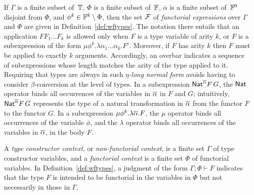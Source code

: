 \documentclass{lmcs}
\theoremstyle{plain}\newtheorem{satz}[thm]{Satz}
\begin{document}
If $\Gamma$ is a finite subset of\, $\mathbb{T}$, $\Phi$ is a finite
subset of\, $\mathbb{F}$, $\overline{\alpha}$ is a finite subset of\,
$\mathbb{F}^0$ disjoint from $\Phi$, and $\phi^k \in \mathbb{F}^k \setminus
\Phi$, then the set $\mathcal{F}$ of {\color{red} {\em functorial expressions}} over
$\Gamma$ and $\Phi$ are given in Definition~\ref{def:wftypes}. The
notation there entails that an application $F F_1...F_k$ is allowed
only when $F$ is a type variable of arity $k$, or $F$ is a
subexpression of the form $\mu \phi^{k}.\lambda
\alpha_1...\alpha_k.F'$. Moreover, if $F$ has arity $k$ then $F$ must
be applied to exactly $k$ arguments.  Accordingly, an overbar
indicates a sequence of subexpressions whose length matches the arity
of the type applied to it.  Requiring that types are always in such
\emph{$\eta$-long normal form} avoids having to consider
$\beta$-conversion at the level of types. In a subexpression
$\mathsf{Nat}^{\overline{\alpha}}F\,G$, the $\mathsf{Nat}$ operator binds all occurrences of
the variables in $\overline{\alpha}$ in $F$ and $G$; intuitively,
$\mathsf{Nat}^{\overline{\alpha}}F\,G$ represents the type of a natural
transformation in $\overline{\alpha}$ from the functor $F$ to the functor
$G$.  In a subexpression $\mu \phi^k.\lambda \overline{\alpha}.F$, the $\mu$
operator binds all occurrences of the variable $\phi$, and the
$\lambda$ operator binds all occurrences of the variables in
$\overline{\alpha}$, in the body $F$.

A {\em type constructor context}, or {\em non-functorial context}, is
a finite set $\Gamma$ of type constructor variables, and a {\em
  functorial context} is a finite set $\Phi$ of functorial
variables. In Definition~\ref{def:wftypes}, a judgment of the form
$\Gamma;\Phi \vdash F$ indicates that the type $F$ is intended to be
functorial in the variables in $\Phi$ but not necessarily in those in
$\Gamma$.
\end{document}
